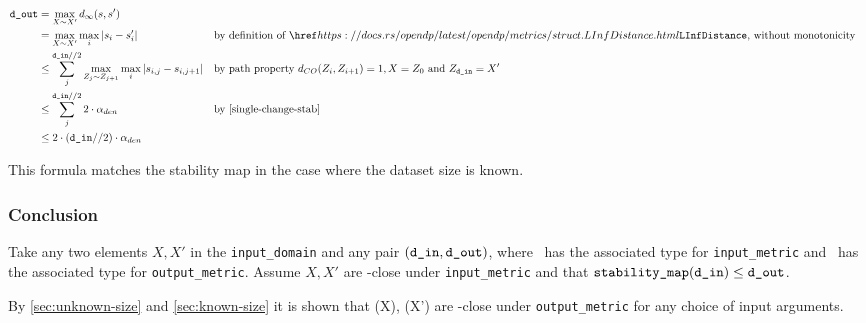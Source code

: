 \documentclass{article}
\begin{document}
\begin{align*}
    \dout &= \max\limits_{X \sim X'} d_{\infty}(s, s') \\
    &= \max\limits_{X \sim X'} \max\limits_{i} |s_i - s'_i| &&\text{by definition of }\rustdoc{metrics/struct}{LInfDistance}\text{, without monotonicity} \\
    &\leq \sum_j^{\din // 2} \max\limits_{Z_{j} \sim Z_{j+1}} \max\limits_{i} |s_{i,j} - s_{i,j+1}| &&\text{by path property } d_{CO}(Z_i, Z_{i+1}) = 1, X = Z_0 \text{ and } Z_\din = X' \\
    &\leq \sum_j^{\din // 2} 2 \cdot \alpha_{den} &&\text{by \ref{single-change-stab}} \\
    &\leq 2 \cdot (\din // 2) \cdot \alpha_{den} \\
\end{align*}

This formula matches the stability map in the case where the dataset size is known.

\subsubsection{Conclusion}
Take any two elements $X, X'$ in the \texttt{input\_domain} and any pair $(\texttt{d\_in}, \texttt{d\_out})$, 
where \din\ has the associated type for \texttt{input\_metric} and \dout\ has the associated type for \texttt{output\_metric}.
Assume $X, X'$ are \din-close under \texttt{input\_metric} and that $\texttt{stability\_map}(\texttt{d\_in}) \leq \texttt{d\_out}$. 

By \ref{sec:unknown-size} and \ref{sec:known-size} it is shown that \function(X), \function(X') are \dout-close under \texttt{output\_metric} for any choice of input arguments.




\end{document}
